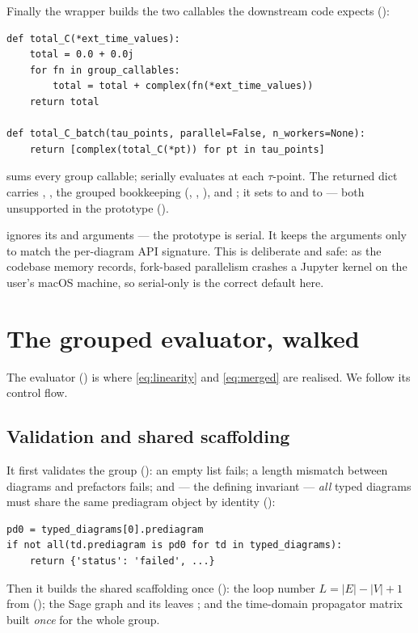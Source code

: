 Finally the wrapper builds the two callables the downstream code expects
():
\begin{lstlisting}
def total_C(*ext_time_values):
    total = 0.0 + 0.0j
    for fn in group_callables:
        total = total + complex(fn(*ext_time_values))
    return total

def total_C_batch(tau_points, parallel=False, n_workers=None):
    return [complex(total_C(*pt)) for pt in tau_points]
\end{lstlisting}
 sums every group callable;  serially
evaluates  at each $\tau$-point. The returned dict carries
, , the grouped bookkeeping (,
, ), and ;
it sets  to  and
 to \code{[]} --- both unsupported in the prototype
().

\begin{gotcha}
 ignores its  and 
arguments --- the prototype is serial. It keeps the arguments only to match the
per-diagram API signature. This is deliberate and safe: as the codebase memory
records, fork-based parallelism crashes a Jupyter kernel on the user's macOS
machine, so serial-only is the correct default here.
\end{gotcha}

\section{The grouped evaluator, walked}

The evaluator  ()
is where \eqref{eq:linearity} and \eqref{eq:merged} are realised. We follow its
control flow.

\subsection{Validation and shared scaffolding}

It first validates the group (): an empty list
fails; a length mismatch between diagrams and prefactors fails; and --- the
defining invariant --- \emph{all} typed diagrams must share the same prediagram
object by identity ():
\begin{lstlisting}
pd0 = typed_diagrams[0].prediagram
if not all(td.prediagram is pd0 for td in typed_diagrams):
    return {'status': 'failed', ...}
\end{lstlisting}
Then it builds the shared scaffolding once ():
the loop number $L = |E| - |V| + 1$ from 
(); the Sage graph  and
its leaves ; and the time-domain propagator matrix
 built
\emph{once} for the whole group.


